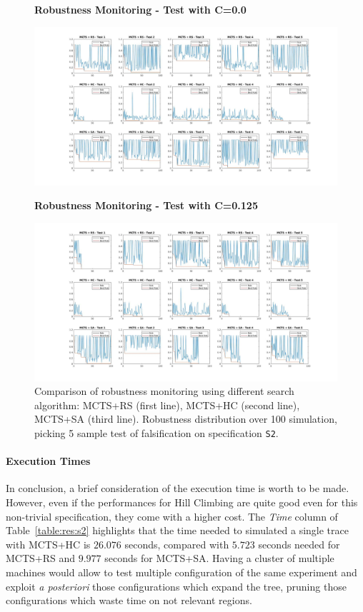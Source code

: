 \documentclass[11pt]{article}
\begin{document}
\begin{figure}[H]
	\label{fig:rob_monitoring}
    \centering
    \textbf{Robustness Monitoring - Test with C=0.0}\par
    \includegraphics[width=\linewidth]{img/0_000/compare_search_rob_blue.jpg}

    \textbf{Robustness Monitoring - Test with C=0.125}\par
    \includegraphics[width=\linewidth]{img/0_125/compare_search_rob_blue_orange.jpg}
    \caption{Comparison of robustness monitoring using different search algorithm: MCTS+RS (first line), MCTS+HC (second line), MCTS+SA (third line). Robustness distribution over 100 simulation, picking 5 sample test of falsification on specification \texttt{S2}.}
\end{figure}

\paragraph{Execution Times}
In conclusion, a brief consideration of the execution time is worth to be made.
However, even if the performances for Hill Climbing are quite good even for this non-trivial specification, they come with a higher cost. The \textit{Time} column of Table~\ref{table:res:s2} highlights that the time needed to simulated a single trace with MCTS+HC is $26.076$ seconds, compared with $5.723$ seconds needed for MCTS+RS and $9.977$ seconds for MCTS+SA.
Having a cluster of multiple machines would allow to test multiple configuration of the same experiment and exploit \textit{a posteriori} those configurations which expand the tree, pruning those configurations which waste time on not relevant regions. 
\end{document}
